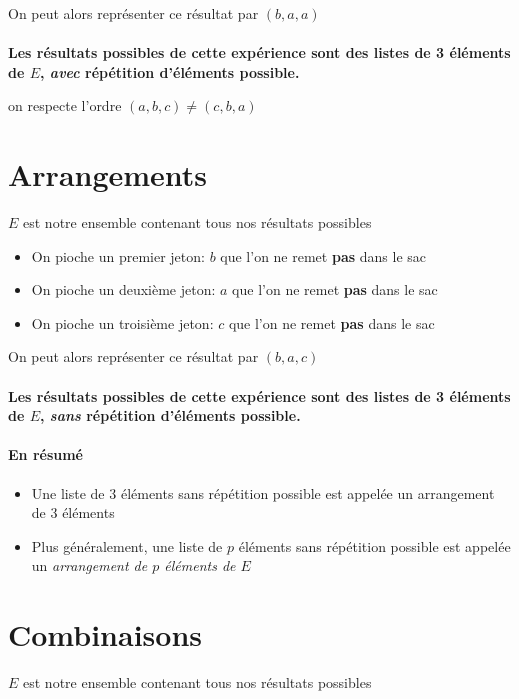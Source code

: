 On peut alors représenter ce résultat par $(b, a, a)$ \\ \\
\textbf{Les résultats possibles de cette expérience sont des listes de 3 éléments de $E$,
  \emph{avec} répétition d’éléments possible.}

 on respecte l'ordre $(a, b, c) \neq (c, b, a)$

\pagebreak

\section{Arrangements}
$E$ est notre ensemble contenant tous nos résultats possibles

\begin{itemize}
  \item On pioche un premier jeton: $b$ que l’on ne remet \textbf{pas} dans le sac
  \item On pioche un deuxième jeton: $a$ que l’on ne remet \textbf{pas} dans le sac
  \item On pioche un troisième jeton: $c$ que l’on ne remet \textbf{pas} dans le sac
\end{itemize}

On peut alors représenter ce résultat par $(b, a, c)$ \\ \\
\textbf{Les résultats possibles de cette expérience sont des listes de 3 éléments de $E$,
  \emph{sans} répétition d’éléments possible.}

\paragraph{En résumé}
\begin{itemize}
  \item Une liste de $3$ éléments sans répétition possible est appelée un arrangement de $3$ éléments
  \item Plus généralement, une liste de $p$ éléments sans répétition possible est appelée un \emph{arrangement de $p$ éléments de $E$}
\end{itemize}

\pagebreak

\section{Combinaisons}
$E$ est notre ensemble contenant tous nos résultats possibles

